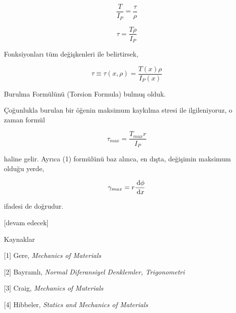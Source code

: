 \documentclass[12pt,fleqn]{article}\usepackage{../../common}
\begin{document}
$$
\frac{T}{I_P} = \frac{\tau}{\rho }
$$

$$
\tau = \frac{T\rho}{I_P} 
$$

Fonksiyonları tüm değişkenleri ile belirtirsek,

$$
\tau \equiv \tau(x,\rho) = \frac{T(x) \rho}{I_P(x)} 
$$


Burulma Formülünü (Torsion Formula) bulmuş olduk.

Çoğunlukla burulan bir öğenin maksimum kaykılma stresi ile ilgileniyoruz, o
zaman formül

$$
\tau_{max} = \frac{T_{max} r}{I_P} 
$$

haline gelir. Ayrıca (1) formülünü baz alınca, en dışta, değişimin maksimum
olduğu yerde,

$$
\gamma_{max} = r \frac{\,\mathrm{d} \phi}{\,\mathrm{d} x}
$$

ifadesi de doğrudur. 

[devam edecek]

Kaynaklar

[1] Gere, {\em Mechanics of Materials}

[2] Bayramlı, {\em Normal Diferansiyel Denklemler, Trigonometri}

[3] Craig, {\em Mechanics of Materials}

[4] Hibbeler, {\em Statics and Mechanics of Materials}
\end{document}
